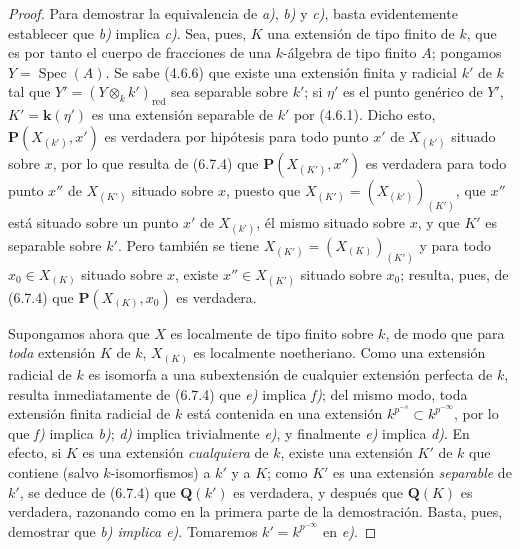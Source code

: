 \begin{proof}
Para demostrar la equivalencia de \emph{a)}, \emph{b)} y \emph{c)}, basta evidentemente establecer
que \emph{b)} implica \emph{c)}. Sea, pues, $K$ una extensión de tipo finito de $k$, que es
por tanto el cuerpo de fracciones de una $k$-álgebra de tipo finito $A$; pongamos
$Y=\operatorname{Spec}(A)$. Se sabe (4.6.6) que existe una extensión finita
y radicial $k'$ de $k$ tal que $Y'=(Y\otimes_k k')_{\mathrm{red}}$ sea
separable sobre $k'$; si $\eta'$ es el punto genérico de $Y'$, $K'=\boldsymbol{k}(\eta')$
es una extensión separable de $k'$ por (4.6.1). Dicho esto,
$\boldsymbol{P}(X_{(k')},x')$ es verdadera por hipótesis para todo punto $x'$ de $X_{(k')}$
situado sobre $x$, por lo que resulta de (6.7.4) que $\boldsymbol{P}(X_{(K')},x'')$ es
verdadera para todo punto $x''$ de $X_{(K')}$ situado sobre $x$, puesto que
$X_{(K')}=(X_{(k')})_{(K')}$, que $x''$ está situado sobre un punto $x'$ de
$X_{(k')}$, él mismo situado sobre $x$, y que $K'$ es separable sobre $k'$.
Pero también se tiene
$X_{(K')}=(X_{(K)})_{(K')}$ y para todo $x_0\in X_{(K)}$ situado sobre
$x$, existe $x''\in X_{(K')}$ situado sobre $x_0$; resulta, pues, de
(6.7.4) que $\boldsymbol{P}(X_{(K)},x_0)$ es verdadera.

Supongamos ahora que $X$ es localmente de tipo finito sobre $k$, de modo que
para \emph{toda} extensión $K$ de $k$, $X_{(K)}$ es localmente noetheriano. Como una
extensión radicial de $k$ es isomorfa a una subextensión de cualquier extensión
perfecta de $k$, resulta inmediatamente de (6.7.4) que \emph{e)} implica \emph{f)}; del mismo
modo, toda extensión finita radicial de $k$ está contenida en una extensión
$k^{p^{-s}}\subset k^{p^{-\infty}}$, por lo que \emph{f)} implica \emph{b)}; \emph{d)} implica
trivialmente \emph{e)}, y finalmente \emph{e)} implica \emph{d)}. En efecto, si $K$ es una extensión
\emph{cualquiera} de $k$,
existe una extensión $K'$ de $k$ que contiene (salvo $k$-isomorfismos) a
$k'$ y a $K$; como $K'$ es una extensión \emph{separable} de $k'$, se deduce de (6.7.4)
que $\boldsymbol{Q}(k')$ es verdadera, y después que $\boldsymbol{Q}(K)$ es verdadera, razonando como en la
primera parte de la demostración. Basta, pues, demostrar que \emph{b) implica
e)}. Tomaremos $k'=k^{p^{-\infty}}$ en \emph{e)}.


\end{proof}
